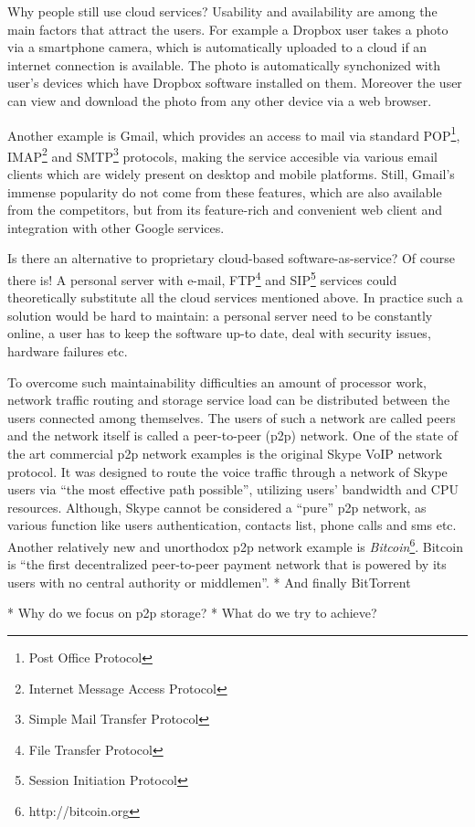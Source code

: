 Why people still use cloud services? Usability and availability are
among the main factors that attract the users. For example a Dropbox
user takes a photo via a smartphone camera, which is automatically
uploaded to a cloud if an internet connection is available.
The photo is automatically synchonized with user's devices which
have Dropbox software installed on them. Moreover the user can
view and download the photo from any other device via a web browser.

Another example is Gmail, which provides an access to mail via
standard
POP\footnote{Post Office Protocol},
IMAP\footnote{Internet Message Access Protocol}
and SMTP\footnote{Simple Mail Transfer Protocol}
protocols, making the service accesible
via various email clients which are widely present on desktop
and mobile platforms. Still, Gmail's immense
popularity\cite{gmail-popularity}
do not come from these features, which are also available
from the competitors, but from its feature-rich and convenient
web client and integration with other Google services.

Is there an alternative to proprietary cloud-based
software-as-service?
Of course there is! A personal server with e-mail,
FTP\footnote{File Transfer Protocol} and
SIP\footnote{Session Initiation Protocol}
services could theoretically substitute all the cloud services
mentioned above. In practice such a solution would be hard to maintain:
a personal server need to be constantly online, a user has to keep
the software up-to date, deal with security issues, hardware failures
etc.

To overcome such maintainability difficulties an amount of
processor work, network traffic routing and storage service load
can be distributed between the users connected among themselves.
The users of such a network are called peers and the network
itself is called a peer-to-peer (p2p) network.
One of the state of the art commercial p2p network examples is the
original Skype VoIP network protocol. It was designed to route the
voice traffic through a network of Skype users via
``the most effective path possible''\cite{skype-p2p}, utilizing
users' bandwidth and CPU resources. Although, Skype cannot
be considered a ``pure'' p2p network, as various function like
users authentication, contacts list, phone calls and sms etc.
Another relatively new and unorthodox p2p network example is
\emph{Bitcoin}\footnote{http://bitcoin.org}. Bitcoin is
``the first decentralized peer-to-peer payment network that
is powered by its users with no central authority or middlemen''.
* And finally BitTorrent


* Why do we focus on p2p storage?
* What do we try to achieve?
